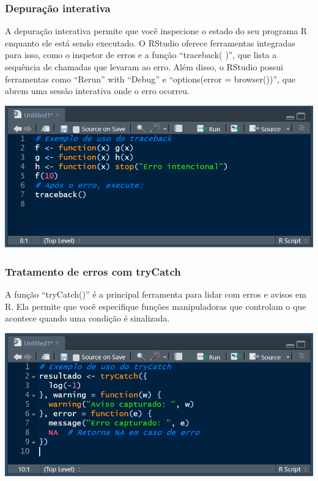 \documentclass[
]{book}
\begin{document}
\subsubsection{Depuração interativa}\label{depurauxe7uxe3o-interativa}

A depuração interativa permite que você inspecione o estado do seu programa R enquanto ele está sendo executado. O RStudio oferece ferramentas integradas para isso, como o inspetor de erros e a função ``traceback( )'', que lista a sequência de chamadas que levaram ao erro. Além disso, o RStudio possui ferramentas como ``Rerun'' with ``Debug'' e ``options(error = browser())'', que abrem uma sessão interativa onde o erro ocorreu.

\includegraphics{images/clipboard-3416304030.png}

\subsubsection{Tratamento de erros com tryCatch}\label{tratamento-de-erros-com-trycatch}

A função ``tryCatch()'' é a principal ferramenta para lidar com erros e avisos em R. Ela permite que você especifique funções manipuladoras que controlam o que acontece quando uma condição é sinalizada.

\includegraphics{images/clipboard-3819030973.png}
\end{document}
